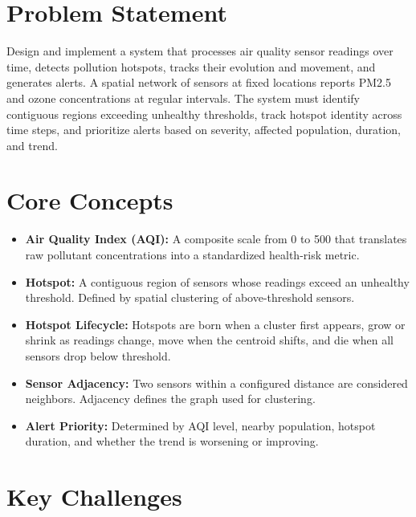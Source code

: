 \section{Problem Statement}

Design and implement a system that processes air quality sensor readings over time, detects pollution hotspots, tracks their evolution and movement, and generates alerts. A spatial network of sensors at fixed locations reports PM2.5 and ozone concentrations at regular intervals. The system must identify contiguous regions exceeding unhealthy thresholds, track hotspot identity across time steps, and prioritize alerts based on severity, affected population, duration, and trend.

\section{Core Concepts}

\begin{itemize}
  \item \textbf{Air Quality Index (AQI):} A composite scale from 0 to 500 that translates raw pollutant concentrations into a standardized health-risk metric.
  \item \textbf{Hotspot:} A contiguous region of sensors whose readings exceed an unhealthy threshold. Defined by spatial clustering of above-threshold sensors.
  \item \textbf{Hotspot Lifecycle:} Hotspots are born when a cluster first appears, grow or shrink as readings change, move when the centroid shifts, and die when all sensors drop below threshold.
  \item \textbf{Sensor Adjacency:} Two sensors within a configured distance are considered neighbors. Adjacency defines the graph used for clustering.
  \item \textbf{Alert Priority:} Determined by AQI level, nearby population, hotspot duration, and whether the trend is worsening or improving.
\end{itemize}

\section{Key Challenges}

